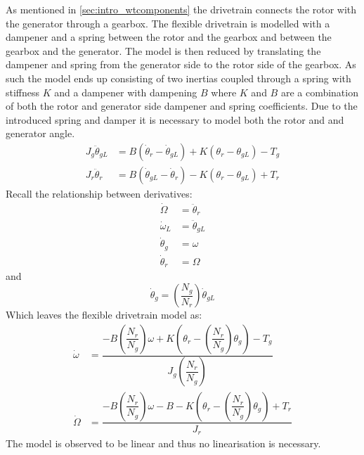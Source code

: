 \medskip
As mentioned in \cref{sec:intro_wtcomponents} the drivetrain connects the rotor with the generator through a gearbox. The flexible drivetrain is modelled with a dampener and a spring between the rotor and the gearbox and between the gearbox and the generator. The model is then reduced by translating the dampener and spring from the generator side to the rotor side of the gearbox. As such the model ends up consisting of two inertias coupled through a spring with stiffness $ K $ and a dampener with dampening $ B $ where $ K $ and $ B $ are a combination of both the rotor and generator side dampener and spring coefficients. Due to the introduced spring and damper it is necessary to model both the rotor and and generator angle.
\begin{align} 
	J_{g} \ddot{\theta}_{gL} & = B (\dot{\theta}_r - \dot{\theta}_{gL}) + K(\theta_r - \theta_{gL}) - T_{g} \label{eq:wtlin_comp_drivetrain_flex_1} \\
	J_{r} \ddot{\theta}_r & = B (\dot{\theta}_{gL} - \dot{\theta}_r ) - K(\theta_r - \theta_{gL}) + T_{r} \label{eq:wtlin_comp_drivetrain_flex_2}
\end{align}
Recall the relationship between derivatives:
\begin{align}
	\dot{\Omega} & = \ddot{\theta}_r \\
	\dot{\omega}_{L} & = \ddot{\theta}_{gL} \\
	\dot{\theta}_g & = \omega \\
	\dot{\theta}_r & = \Omega
\end{align}
and
\begin{equation}\label{eq:wtlin_comp_drivetrain_flex_mod_3}
	\dot{\theta}_g = \left(\dfrac{N_g}{N_r}\right) \dot{\theta}_{gL} 
\end{equation}
Which leaves the flexible drivetrain model as:
\begin{align} 
	\dot{\omega} & = \dfrac{-B \left(\dfrac{N_r}{N_g}\right)\omega + K(\theta_r - \left(\dfrac{N_r}{N_g}\right) \theta_{g}) - T_{g}}{J_{g} \left(\dfrac{N_r}{N_g}\right) } \label{eq:wtlin_comp_drivetrain_flex_mod_1} \\
	\dot{\Omega} & = \dfrac{-B \left(\dfrac{N_r}{N_g}\right) \omega -B - K(\theta_r - \left(\dfrac{N_r}{N_g}\right) \theta_{g}) + T_{r}}{J_{r}} \label{eq:wtlin_comp_drivetrain_flex_mod_2} %
\end{align}
The model is observed to be linear and thus no linearisation is necessary.

